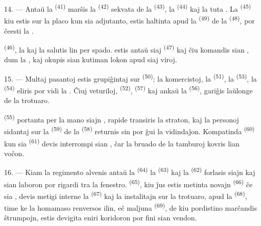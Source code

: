 \VUsaut{3.0mm}

14. --- Antaŭ la  \textsuperscript{(41)} marŝis la
 \textsuperscript{(42)} sekvata de la 
\textsuperscript{(43)}, la  \textsuperscript{(44)} kaj la
tuta . La  \textsuperscript{(45)} kiu estis
sur la placo kun sia adjutanto, estis haltinta apud la 
\textsuperscript{(49)} de la  \textsuperscript{(48)}, por
ĉeesti la .

 \textsuperscript{(46)}, la  kaj la
 salutis lin per spado.  estis
antaŭ siaj  \textsuperscript{(47)} kaj ĉiu 
komandis sian , dum la ,
 kaj  okupis sian kutiman lokon
apud siaj viroj.

15. --- Multaj pasantoj estis grupiĝintaj sur 
\textsuperscript{(50)}; la komercistoj, la 
\textsuperscript{(51)}, la  \textsuperscript{(53)}, la
 \textsuperscript{(54)} eliris por vidi la
. Ĉiuj veturiloj,  \textsuperscript{(52)},
 \textsuperscript{(57)} kaj ankaŭ la
 \textsuperscript{(56)}, gariĝis laŭlonge de la trotuaro.

\VUsaut{3.0mm}

 \textsuperscript{(55)} portanta per la mano siajn
, rapide transiris la straton, kaj la personoj
sidantaj sur la  \textsuperscript{(59)} de la
 \textsuperscript{(58)} returnis sin por ĝui la vidindaĵon.
Kompatinda  \textsuperscript{(60)} kun sia
 \textsuperscript{(61)} devis interrompi sian
, ĉar la bruado de la tamburoj kovris lian voĉon.

16. --- Kiam la regimento alvenis antaŭ la 
\textsuperscript{(64)} la  \textsuperscript{(63)} kaj la
 \textsuperscript{(62)} forlasis siajn 
kaj sian laboron por rigardi tra la fenestro. 
\textsuperscript{(65)}, kiu ĵus estis metinta novajn 
\textsuperscript{(66)} ĉe sia , devis metigi interne la
 \textsuperscript{(67)} kaj la  instalitajn
sur la trotuaro, apud la  \textsuperscript{(68)}, time ke
la homamaso renversos ilin, eĉ maljuna 
\textsuperscript{(69)}, de kiu pordistino marĉandis ŝtrumpojn, estis devigita
eniri koridoron por fini sian vendon.

